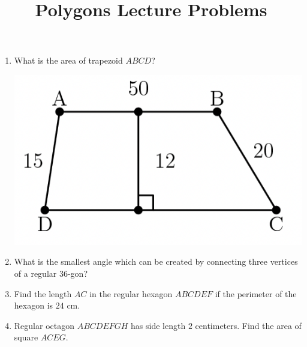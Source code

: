 \documentclass{article}
\title{Polygons Lecture Problems}
\author{}
\date{}
\begin{document}
\maketitle
\begin{enumerate}
    \item What is the area of trapezoid $ABCD$?
        \begin{center}
            \includegraphics[scale=0.6]{trapezoid2.png}
        \end{center}
        \vspace{1cm}
    \item What is the smallest angle which can be created by connecting three vertices of a regular $36$-gon?
        \vspace{3cm}
    \item Find the length $AC$ in the regular hexagon $ABCDEF$ if the perimeter of the hexagon is $24$ cm.
        \vspace{3cm}
    \item Regular octagon $ABCDEFGH$ has side length $2$ centimeters.
        Find the area of square $ACEG$.
\end{enumerate}
\end{document}
